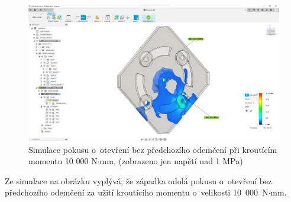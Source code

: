\begin{figure}[htbp]
    \centering
    \includegraphics[width=\textwidth]{kapitoly/obrazky/M3/simulace/odolnost_proti_nasilnemu_odemceni_10Nm.png}
    \caption{Simulace pokusu o~otevření bez předchozího odemčení při kroutícím momentu 10 000 N$\cdot$mm, (zobrazeno jen napětí nad 1 MPa) \centering}
    \label{fig:M3-simulace-zapadka}
\end{figure}
Ze simulace na obrázku  vyplývá, že západka odolá pokusu o~otevření bez předchozího odemčení za užití kroutícího momentu o~velikosti 10~000~N$\cdot$mm.



\begin{table}[h]
    \centering
    \caption{Tabulka značení veličin pro napětí v~kolíku v~krutu}
    \label{tab:M3_symboly_kolik_otaceni}
\end{table}

